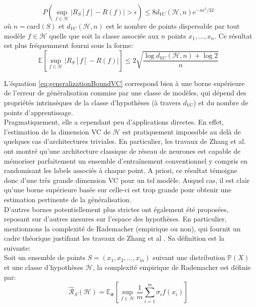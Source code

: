 \begin{equation}
	P(\sup_{f \in \mathcal{H}}| R_S[f] - R(f)| > \epsilon) \leq 8 d_{VC}(\mathcal{H}, n) e^{-n\epsilon^2/32}
\end{equation}
où $n=\text{card}(S)$ et $d_{VC}(\mathcal{H}, n)$ est le nombre de points dispersable  par tout modèle  $f \in \mathcal{H}$ quelle que soit la classe associée aux $n$ points $x_1, ..., x_n$. Ce résultat est plus fréquemment fourni sous la forme:
\begin{equation}
	\label{eq:generalizationBoundVC}
	\mathbb{E}[\sup_{f \in \mathcal{H}}| R_S[f] - R(f)|] \leq 2 \sqrt{\dfrac{\log d_{VC}(\mathcal{H}, n) + \log 2}{n}}
\end{equation}

L'équation \ref{eq:generalizationBoundVC} correspond bien à une borne supérieure de l'erreur de généralisation commise par une classe de modèles, qui dépend des propriétés intrinsèques de la classe d'hypothèses (à travers $d_{VC}$) et du nombre de points d'apprentissage. 
\\
Pragmatiquement, elle a cependant peu d'applications directes. En effet, l'estimation de la dimension VC de $\mathcal{H}$ est pratiquement impossible au delà de quelques cas d'architectures triviales. En particulier, les travaux de Zhang et al. \cite{zhangUnderstandingDeepLearning2021} ont montré qu'une architecture classique de réseau de neurones est capable de mémoriser parfaitement un ensemble d'entraînement conventionnel y compris en randomisant les labels associés à chaque point. A priori, ce résultat témoigne donc d'une très grande dimension VC pour un tel modèle. Auquel cas, il est clair qu'une borne supérieure basée sur celle-ci est trop grande pour obtenir une estimation pertinente de la généralisation. \\
D'autres bornes potentiellement plus strictes ont également été proposées, reposant sur d'autres mesures sur l'espace des hypothèses. En particulier, mentionnons la complexité de Rademacher (empirique ou non), qui fournit un cadre théorique justifiant les travaux de Zhang et al \cite{zhangUnderstandingDeepLearning2021}. Sa définition est la suivante:
\\
Soit un ensemble de points $S=(x_1, x_2, ...,x_m)$ suivant une distribution $\mathbb{P}(X)$ et une classe d'hypothèses $\mathcal{H}$, la complexité empirique de Rademacher est définie par:
\begin{equation}
	\hat{\mathcal{R}}_S(\mathcal{H}) =  \mathbb{E_{\mathbf{\sigma}}}[\sup_{f \in \mathcal{H}} \frac{1}{m} \sum_{i=1}^{m} \sigma_i f(x_i)]
\end{equation}
